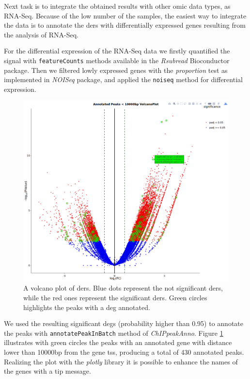 Next task is to integrate the obtained results with other omic data types, as RNA-Seq. 
Because of the low number of the samples, the easiest way to integrate the data is to annotate the \glspl{der} with differentially expressed genes resulting from the analysis of RNA-Seq.

For the differential expression of the RNA-Seq data we firstly quantified the signal with \lstinline!featureCounts! methods available in the \textit{Rsubread} \cite{Liao2013} Bioconductor package.
Then we filtered lowly expressed genes with the \textit{proportion} test  as implemented in \textit{NOISeq} package, and applied the \lstinline!noiseq! method for differential expression.

\begin{figure}[H]
\centering
\includegraphics[width=\textwidth, height=\textheight, keepaspectratio]{img/descan2/Annotated_depeaks_degenes.png}
\caption[Annotated Differential Enrichment Regions Volcano]{A volcano plot of \glspl{der}. Blue dots represent the not significant \glspl{der}, while the red ones represent the significant \glspl{der}. Green circles highlights the peaks with a \gls{deg} annotated.}
\label{fig:depeakdegenessdescan}
\centering
\end{figure}

We used the resulting significant \glspl{deg} (probability higher than 0.95) to annotate the peaks with \lstinline!annotatePeakInBatch! method of \textit{ChIPpeakAnno}.
Figure 	\ref{fig:depeakdegenessdescan} illustrates with green circles the peaks with an annotated gene with distance lower than 10000bp from the gene \gls{tss}, producing a total of 430 annotated peaks.
Realizing the plot with the \textit{plotly} library it is possible to enhance the names of the genes with a tip message.

